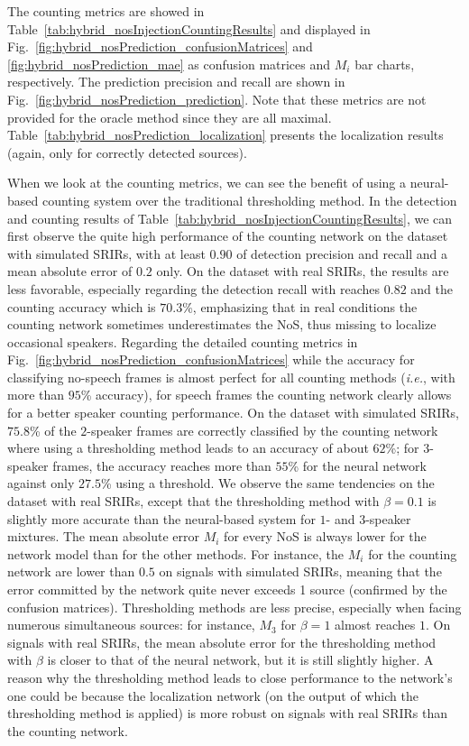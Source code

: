 The counting metrics are showed in Table~\ref{tab:hybrid_nosInjectionCountingResults} and displayed in Fig.~\ref{fig:hybrid_nosPrediction_confusionMatrices} and \ref{fig:hybrid_nosPrediction_mae} as confusion matrices and $M_i$ bar charts, respectively. The prediction precision and recall are shown in  Fig.~\ref{fig:hybrid_nosPrediction_prediction}. Note that these metrics are not provided for the oracle method since they are all maximal. Table~\ref{tab:hybrid_nosPrediction_localization} presents the localization results (again, only for correctly detected sources).

When we look at the counting metrics, we can see the benefit of using a neural-based counting system over the traditional thresholding method. In the detection and counting results of Table~\ref{tab:hybrid_nosInjectionCountingResults}, we can first observe the quite high performance of the counting network on the dataset with simulated SRIRs, with at least $0.90$ of detection precision and recall and a mean absolute error of $0.2$ only. On the dataset with real SRIRs, the results are less favorable, especially regarding the detection recall with reaches $0.82$ and the counting accuracy which is $70.3$\%, emphasizing that in real conditions the counting network sometimes underestimates the NoS, thus missing to localize occasional speakers.
Regarding the detailed counting metrics in Fig.~\ref{fig:hybrid_nosPrediction_confusionMatrices} while the accuracy for classifying no-speech frames is almost perfect for all counting methods (\emph{i.e.}, with more than $95$\% accuracy), for speech frames the counting network clearly allows for a better speaker counting performance. On the dataset with simulated SRIRs, $75.8$\% of the $2$-speaker frames are correctly classified by the counting network where using a thresholding method leads to an accuracy of about $62$\%; for $3$-speaker frames, the accuracy reaches more than $55$\% for the neural network against only $27.5$\% using a threshold. We observe the same tendencies on the dataset with real SRIRs, except that the thresholding method with $\beta=0.1$ is slightly more accurate than the neural-based system for $1$- and $3$-speaker mixtures. The mean absolute error $M_i$ for every NoS is always lower for the network model than for the other methods. For instance, the $M_i$ for the counting network are lower than $0.5$ on signals with simulated SRIRs, meaning that the error committed by the network quite never exceeds 1 source (confirmed by the confusion matrices). Thresholding methods are less precise, especially when facing numerous simultaneous sources: for instance, $M_3$ for $\beta=1$ almost reaches $1$. On signals with real SRIRs, the mean absolute error for the thresholding method with $\beta$ is closer to that of the neural network, but it is still slightly higher. A reason why the thresholding method leads to close performance to the network's one could be because the localization network (on the output of which the thresholding method is applied) is more robust on signals with real SRIRs than the counting network.

